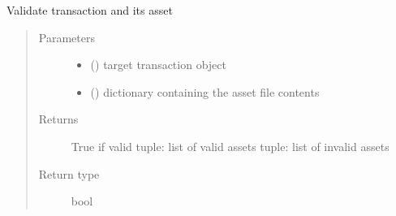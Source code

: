 \documentclass[letterpaper,10pt,english]{sphinxmanual}
\begin{document}
\begin{fulllineitems}
\label{\detokenize{bbc1.core.bbclib:bbc1.core.bbclib.validate_transaction_object}}
Validate transaction and its asset
\begin{quote}\begin{description}
\item[{Parameters}] \leavevmode\begin{itemize}
\item {} 
 ({\hyperref[\detokenize{bbc1.core.bbclib:bbc1.core.bbclib.BBcTransaction}]{}}) \textendash{} target transaction object

\item {} 
 () \textendash{} dictionary containing the asset file contents

\end{itemize}

\item[{Returns}] \leavevmode
True if valid
tuple: list of valid assets
tuple: list of invalid assets

\item[{Return type}] \leavevmode
bool

\end{description}\end{quote}

\end{fulllineitems}

\end{document}
